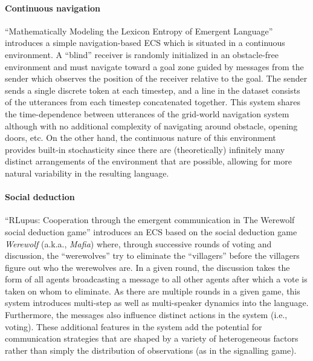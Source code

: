 \paragraph{Continuous navigation}
``Mathematically Modeling the Lexicon Entropy of Emergent Language'' \citep[GPL-3.0 license]{boldt2023mathmodel} introduces a simple navigation-based ECS which is situated in a continuous environment.
A ``blind'' receiver is randomly initialized in an obstacle-free environment and must navigate toward a goal zone guided by messages from the sender which observes the position of the receiver relative to the goal.
The sender sends a single discrete token at each timestep, and a line in the dataset consists of the utterances from each timestep concatenated together.
This system shares the time-dependence between utterances of the grid-world navigation system although with no additional complexity of navigating around obstacle, opening doors, etc.
On the other hand, the continuous nature of this environment provides built-in stochasticity since there are (theoretically) infinitely many distinct arrangements of the environment that are possible, allowing for more natural variability in the resulting language.

\paragraph{Social deduction}
``RLupus: Cooperation through the emergent communication in The Werewolf social deduction game'' \citep[GPL-3.0 license]{brandizzi2022rlupus} introduces an ECS based on the social deduction game \emph{Werewolf} (a.k.a., \emph{Mafia}) where, through successive rounds of voting and discussion, the ``werewolves'' try to eliminate the ``villagers'' before the villagers figure out who the werewolves are.
In a given round, the discussion takes the form of all agents broadcasting a message to all other agents after which a vote is taken on whom to eliminate.
As there are multiple rounds in a given game, this system introduces multi-step as well as multi-speaker dynamics into the language.
Furthermore, the messages also influence distinct actions in the system (i.e., voting).
These additional features in the system add the potential for communication strategies that are shaped by a variety of heterogeneous factors rather than simply the distribution of observations (as in the signalling game).
